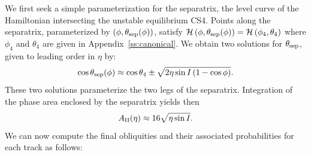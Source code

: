 \documentclass[twocolumn,twocolappendix]{aastex63}
\newcommand*{\p}[1]{\left(#1\right)}
\begin{document}
We first seek a simple parameterization for the separatrix, the level curve of
the Hamiltonian intersecting the unstable equilibrium CS4. Points along the
separatrix, parameterized by $\p{\phi, \theta_{\rm sep}(\phi)}$, satisfy
$\mathcal{H}\p{\phi, \theta_{\rm sep}(\phi)} = \mathcal{H}\p{\phi_4, \theta_4}$
where $\phi_4$ and $\theta_4$ are given in Appendix~\ref{ss:canonical}. We
obtain two solutions for $\theta_{\rm sep}$, given to leading order in $\eta$
by:
\begin{equation}
    \cos \theta_{\rm sep}(\phi) \approx \cos \theta_4 \pm
        \sqrt{2\eta \sin I\p{1 - \cos \phi}}.
\end{equation}
These two solutions parameterize the two legs of the separatrix. Integration of
the phase area enclosed by the separatrix yields then
\begin{equation}
    A_{\rm II}(\eta) \approx 16\sqrt{\eta \sin I}.\label{eq:a_approx}
\end{equation}
We can now compute the final obliquities and their associated probabilities for
each track as follows:
\end{document}
